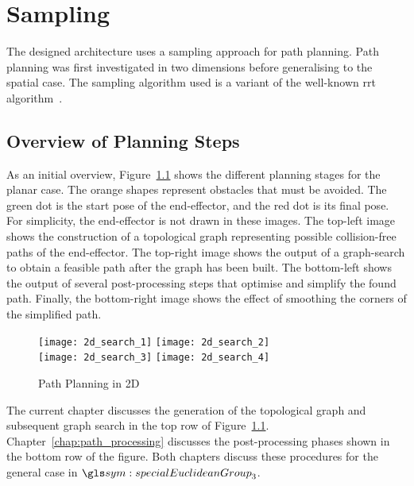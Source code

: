 \chapter{Sampling}%
\label{chap:sampling}

	The designed architecture uses a sampling approach for path planning. Path
	planning was first investigated in two dimensions before generalising to the
	spatial case. The sampling algorithm used is a variant
	of the well-known \gls{rrt}
	algorithm~\cite{bib:planning:rapidly-exploring_random_trees_a_new_tool_for_path_planning}.

	\section{Overview of Planning Steps}

		As an initial overview, Figure~\ref{fig:path_planning_in_2d} shows the
		different planning stages for the planar case. The orange shapes
		represent obstacles that must be avoided. The green dot is the start
		pose of the end-effector, and the red dot is its final pose. For
		simplicity, the end-effector is not drawn in these images. The top-left
		image shows the construction of a topological graph representing
		possible collision-free paths of the end-effector. The top-right image
		shows the output of a graph-search to obtain a feasible path after the
		graph has been built. The bottom-left shows the output of several
		post-processing steps that optimise and simplify the found path.
		Finally, the bottom-right image shows the effect of smoothing the
		corners of the simplified path.

		\begin{figure}[htb]
			\centering
				\texttt{[image: 2d\_search\_1]}%
				\texttt{[image: 2d\_search\_2]}\\
				\texttt{[image: 2d\_search\_3]}%
				\texttt{[image: 2d\_search\_4]}
			\caption{Path Planning in 2D}
			\label{fig:path_planning_in_2d}
		\end{figure}

		The current chapter discusses the generation of the topological graph
		and subsequent graph search in the top row of
		Figure~\ref{fig:path_planning_in_2d}. Chapter~\ref{chap:path_processing}
		discusses the post-processing phases shown in the bottom row of the
		figure.  Both chapters discuss these procedures for the general case in
		$\specialEuclideanGroup{3}$.

	
	
	
	

